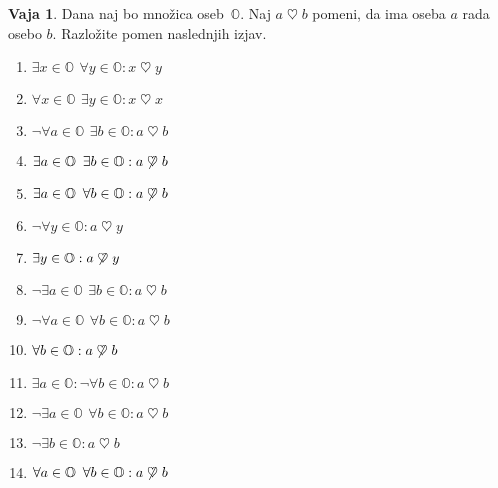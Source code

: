 \documentclass{article}
\theoremstyle{definition}
\newtheorem{vaja}{Vaja}
\begin{document}
\newcommand{\rad}{\mathrel{\heartsuit}}
\begin{vaja}
Dana naj bo množica oseb~$\mathbb{O}$. Naj $a \rad b$ pomeni, da ima oseba $a$ rada osebo $b$.
Razložite pomen naslednjih izjav.
\begin{enumerate}
\item $\exists x \in \mathbb{O}\,\ \forall y \in \mathbb{O}: x \rad y$
\item $\forall x \in \mathbb{O}\,\ \exists y \in \mathbb{O}: x \rad x$
\item $\lnot \forall a \in \mathbb{O}\,\ \exists b \in \mathbb{O}:  a \rad b$
\item $\exists a \in \mathbb{O}\,\ \exists b \in \mathbb{O}: a \not\rad b$
\item $\exists a \in \mathbb{O}\,\ \forall b \in \mathbb{O}: a \not\rad b$
\item $\lnot \forall y \in \mathbb{O}: a \rad y$
\item $\exists y \in \mathbb{O}: a \not\rad y$
\item $\lnot \exists a \in \mathbb{O}\,\ \exists b \in \mathbb{O}: a \rad b$
\item $\lnot \forall a \in \mathbb{O}\,\ \forall b \in \mathbb{O}: a \rad b$
\item $\forall b \in \mathbb{O}: a \not\rad b$
\item $\exists a \in \mathbb{O}: \lnot \forall b \in \mathbb{O}:  a \rad b$
\item $\lnot \exists a \in \mathbb{O}\,\ \forall b \in \mathbb{O}: a \rad b$
\item $\lnot \exists b \in \mathbb{O}: a \rad b$
\item $\forall a \in \mathbb{O}\,\ \forall b \in \mathbb{O}:  a \not\rad b$
\end{enumerate}
\end{vaja}
\end{document}
